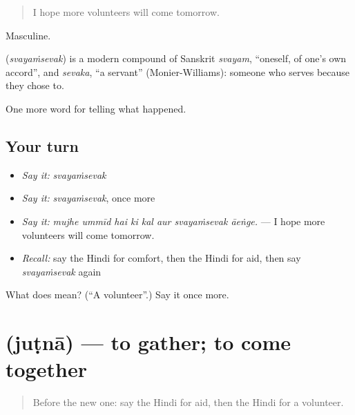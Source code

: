 \begin{quote}
I hope more volunteers will come tomorrow.
\end{quote}

Masculine.

\begin{cousinweb}
\textbf{} (\emph{svayaṁsevak}) is a modern compound of Sanskrit \emph{svayam}, \textquotedblleft{}oneself, of one's own accord\textquotedblright{}, and \emph{sevaka}, \textquotedblleft{}a servant\textquotedblright{} (Monier-Williams): someone who serves because they chose to.
\end{cousinweb}

\begin{grammarlens}[title={What you've built}]
One more word for telling what happened.
\end{grammarlens}

\subsection*{Your turn}
\begin{itemize}
\raggedright
  \item \emph{Say it:} \emph{svayaṁsevak}
  \item \emph{Say it:} \emph{svayaṁsevak}, once more
  \item \emph{Say it:} \emph{mujhe ummīd hai ki kal aur svayaṁsevak āeṅge.} — I hope more volunteers will come tomorrow.
  \item \emph{Recall:} say the Hindi for comfort, then the Hindi for aid, then say \emph{svayaṁsevak} again
\end{itemize}

\begin{tcolorbox}[breakable,colback=teal!4,colframe=teal!35!black,title={Before you move on}]
What does  mean? (\textquotedblleft{}A volunteer\textquotedblright{}.) Say it once more.
\end{tcolorbox}
\section[\texorpdfstring{\hi{जुटना} (juṭnā)}{जुटना (juṭnā)}]{ (juṭnā) — to gather; to come together}

\label{lesson:HI-C311-jutna}



\begin{quote}
Before the new one: say the Hindi for aid, then the Hindi for a volunteer.
\end{quote}

